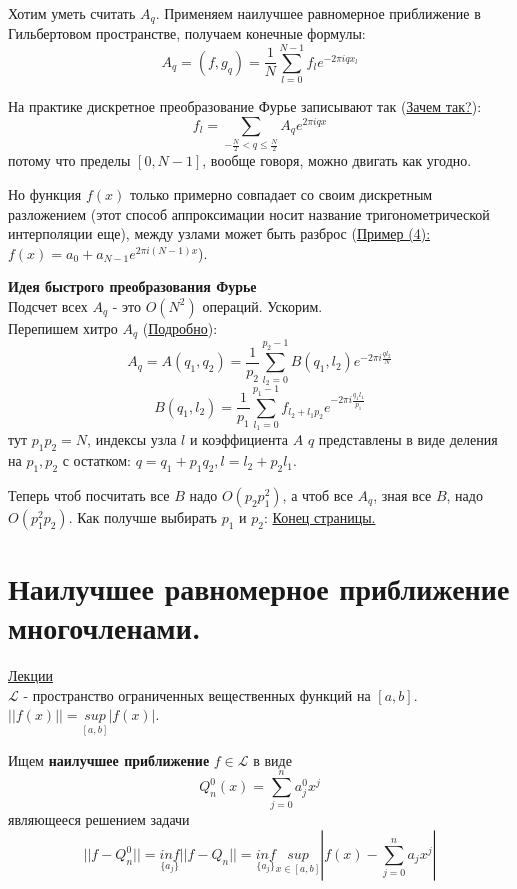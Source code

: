 \documentclass[specialist, subf, href, colorlinks=true, 12pt, times, mtpro, final]{disser}
\theoremstyle{definition}
\begin{document}
    Хотим уметь считать $A_q$. Применяем наилучшее равномерное приближение в Гильбертовом пространстве, получаем конечные формулы:
    $$
        A_q = (f, g_q) = \frac{1}{N}\sum\limits_{l = 0}^{N-1}f_le^{-2\pi i qx_l}
    $$
    
    На практике дискретное преобразование Фурье записывают так (\hyperlink {lects.33}{Зачем так?}):
    $$
        f_l = \sum\limits_{-\frac{N}{2} < q \le \frac{N}{2}} A_q e ^{2\pi i qx}
    $$
    потому что пределы $[0,N-1]$, вообще говоря, можно двигать как угодно.
    
    Но функция $f(x)$ только примерно совпадает со своим дискретным разложением (этот способ аппроксимации носит название тригонометрической интерполяции еще), между узлами может быть разброс (\hyperlink {lects.33}{Пример (4):} $f(x) = a_0 + a_{N-1}e^{2\pi i (N-1)x}$).
    
    \textbf{Идея быстрого преобразования Фурье} \\
    Подсчет всех $A_q$ - это $O(N^2)$ операций. Ускорим.\\
    Перепишем хитро $A_q$ (\hyperlink {lects.34}{Подробно}):
    $$
        A_q = A(q_1, q_2) = \frac{1}{p_2}\sum\limits_{l_2 = 0}^{p_2 - 1} B(q_1, l_2)e^{-2\pi i \frac{ql_2}{N}}
    $$
    $$
        B(q_1, l_2) = \frac{1}{p_1}\sum\limits_{l_1 = 0}^{p_1 - 1}f_{l_2 + l_1p_2}e^{-2\pi i \frac{q_1l_1}{p_1}}
    $$
    тут $p_1p_2 = N$, индексы узла $l$ и коэффициента $A$ $q$ представлены в виде деления на $p_1, p_2$ с остатком: $q = q_1 + p_1q_2, l = l_2 + p_2l_1$.
    
    Теперь чтоб посчитать все $B$ надо $O(p_2p_1^2)$, а чтоб все $A_q$, зная все $B$, надо $O(p_1^2p_2)$. 
    Как получше выбирать $p_1$ и $p_2$: \hyperlink {lects.34}{Конец страницы.}

\section {Наилучшее равномерное приближение многочленами.}
    \hyperlink {lects.35}{Лекции}\\
    $\mathcal{L}$ - пространство ограниченных вещественных функций на $[a,b]$. $||f(x)|| = \underset{[a,b]}{sup}|f(x)|$.
    
    Ищем \textbf{наилучшее приближение} $f\in \mathcal{L}$ в виде
    $$
        Q_n^0 (x) = \sum\limits_{j=0}^{n}a_j^0x^j
    $$
    являющееся решением задачи
    $$
        ||f - Q_n^0|| = \underset{\{a_j\}}{inf}||f-Q_n|| = \underset{\{a_j\}}{inf} \underset{x\in [a,b]}{sup} |f(x) - \sum\limits_{j=0}^{n} a_jx^j|
    $$
    
\end{document}
